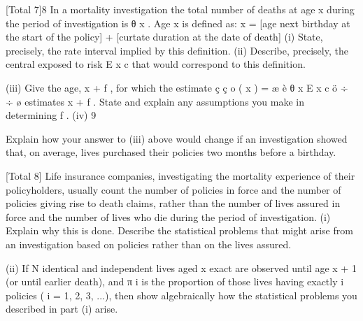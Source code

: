 \documentclass[a4paper,12pt]{article}
\begin{document}
[Total 7]8
In a mortality investigation the total number of deaths at age x during the period
of investigation is θ x . Age x is defined as:
x = [age next birthday at the start of the policy]
+ [curtate duration at the date of death]
(i) State, precisely, the rate interval implied by this definition.
(ii) Describe, precisely, the central exposed to risk E x c that would correspond
to this definition.

(iii) Give the age, x + f , for which the estimate ç ç \mu o ( x ) =
æ
è
θ x
E x c
ö
÷
÷
ø
estimates \mu x + f .
State and explain any assumptions you make in determining f .
(iv)
9


Explain how your answer to (iii) above would change if an investigation
showed that, on average, lives purchased their policies two months before
a birthday.

[Total 8]
Life insurance companies, investigating the mortality experience of their
policyholders, usually count the number of policies in force and the number of
policies giving rise to death claims, rather than the number of lives assured in
force and the number of lives who die during the period of investigation.
(i) Explain why this is done. Describe the statistical problems that might
arise from an investigation based on policies rather than on the lives
assured.

(ii) If N identical and independent lives aged x exact are observed until age
x + 1 (or until earlier death), and π i is the proportion of those lives having
exactly i policies ( i = 1, 2, 3, ...), then show algebraically how the
statistical problems you described in part (i) arise.
\end{document}
